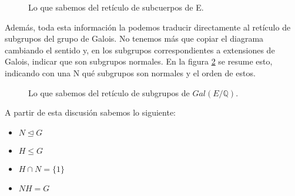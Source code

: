 \documentclass[a4paper, 11pt]{article}
\begin{document}
\begin{solucion}
\begin{figure}[ht]
          \caption{Lo que sabemos del retículo de subcuerpos de E.}
          \label{retE}
      \end{figure}

      Además, toda esta información la podemos traducir directamente al retículo de subgrupos del grupo de Galois. No tenemos más que copiar el diagrama cambiando el sentido y, en los subgrupos correspondientes a extensiones de Galois, indicar que son subgrupos normales. En la figura \ref{retGalE} se resume esto, indicando con una N qué subgrupos son normales y el orden de estos.

      \begin{figure}[ht]
          \centering
          \caption{Lo que sabemos del retículo de subgrupos de $Gal(E/\mathbb{Q})$.}
          \label{retGalE}
      \end{figure}

      A partir de esta discusión sabemos lo siguiente:
      \begin{itemize}
          \item $N \trianglelefteq G$
          \item $H \leq G$
          \item $H \cap N = \{1\}$
          \item $NH = G$
      \end{itemize}


\end{solucion}
\end{document}
